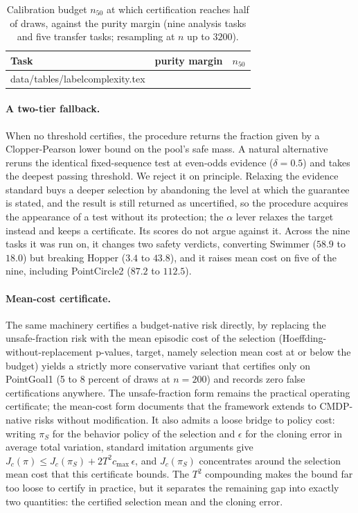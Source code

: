 \documentclass{article} %
\makeatletter
\newcommand{\tabinput}[1]{\@@input#1 }
\makeatother
\begin{document}
\begin{table}[h]
\caption{Calibration budget $n_{50}$ at which certification reaches half of draws, against the purity margin (nine analysis tasks and five transfer tasks; resampling at $n$ up to $3200$).}
\label{tab:labelcomplexity}
\begin{center}
\small
\begin{tabular}{l rr}
\toprule
Task & purity margin & $n_{50}$ \\
\midrule
\tabinput{data/tables/labelcomplexity.tex}
\bottomrule
\end{tabular}
\end{center}
\end{table}

\paragraph{A two-tier fallback.} When no threshold certifies, the procedure returns the fraction given by a Clopper-Pearson lower bound on the pool's safe mass. A natural alternative reruns the identical fixed-sequence test at even-odds evidence ($\delta = 0.5$) and takes the deepest passing threshold. We reject it on principle. Relaxing the evidence standard buys a deeper selection by abandoning the level at which the guarantee is stated, and the result is still returned as uncertified, so the procedure acquires the appearance of a test without its protection; the $\alpha$ lever relaxes the target instead and keeps a certificate. Its scores do not argue against it. Across the nine tasks it was run on, it changes two safety verdicts, converting Swimmer ($58.9$ to $18.0$) but breaking Hopper ($3.4$ to $43.8$), and it raises mean cost on five of the nine, including PointCircle2 ($87.2$ to $112.5$).

\paragraph{Mean-cost certificate.} The same machinery certifies a budget-native risk directly, by replacing the unsafe-fraction risk with the mean episodic cost of the selection (Hoeffding-without-replacement p-values, target, namely selection mean cost at or below the budget) yields a strictly more conservative variant that certifies only on PointGoal1 (5 to 8 percent of draws at $n = 200$) and records zero false certifications anywhere. The unsafe-fraction form remains the practical operating certificate; the mean-cost form documents that the framework extends to CMDP-native risks without modification. It also admits a loose bridge to policy cost: writing $\pi_S$ for the behavior policy of the selection and $\epsilon$ for the cloning error in average total variation, standard imitation arguments give $J_c(\pi) \le J_c(\pi_S) + 2T^2 c_{\max}\, \epsilon$, and $J_c(\pi_S)$ concentrates around the selection mean cost that this certificate bounds. The $T^2$ compounding makes the bound far too loose to certify in practice, but it separates
the remaining gap into exactly two quantities: the certified selection mean and the cloning error.
\end{document}

